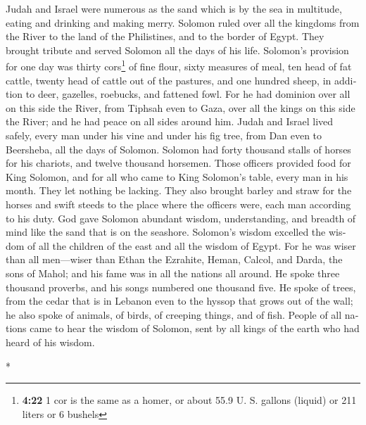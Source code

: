 \begin{paracol}{2}
\begin{otherlanguage}{english}
 Judah and Israel were numerous as the sand which is by
the sea in multitude, eating and drinking and making merry.
 Solomon ruled over all the kingdoms from the River to
the land of the Philistines, and to the border of Egypt. They brought
tribute and served Solomon all the days of his life. 
Solomon's provision for one day was thirty cors\footnote{\textbf{4:22} 1
  cor is the same as a homer, or about 55.9 U. S. gallons (liquid) or
  211 liters or 6 bushels} of fine flour, sixty measures of meal,
 ten head of fat cattle, twenty head of cattle out of the
pastures, and one hundred sheep, in addition to deer, gazelles,
roebucks, and fattened fowl.  For he had dominion over
all on this side the River, from Tiphsah even to Gaza, over all the
kings on this side the River; and he had peace on all sides around him.
 Judah and Israel lived safely, every man under his vine
and under his fig tree, from Dan even to Beersheba, all the days of
Solomon.  Solomon had forty thousand stalls of horses for
his chariots, and twelve thousand horsemen.  Those
officers provided food for King Solomon, and for all who came to King
Solomon's table, every man in his month. They let nothing be lacking.
 They also brought barley and straw for the horses and
swift steeds to the place where the officers were, each man according to
his duty.  God gave Solomon abundant wisdom,
understanding, and breadth of mind like the sand that is on the
seashore.  Solomon's wisdom excelled the wisdom of all
the children of the east and all the wisdom of Egypt. 
For he was wiser than all men---wiser than Ethan the Ezrahite, Heman,
Calcol, and Darda, the sons of Mahol; and his fame was in all the
nations all around.  He spoke three thousand proverbs,
and his songs numbered one thousand five.  He spoke of
trees, from the cedar that is in Lebanon even to the hyssop that grows
out of the wall; he also spoke of animals, of birds, of creeping things,
and of fish.  People of all nations came to hear the
wisdom of Solomon, sent by all kings of the earth who had heard of his
wisdom.

\end{otherlanguage}

\switchcolumn[0]*

\hypertarget{el-contrato-de-salomuxf3n-con-hiram-de-tiro-y-los-preparativos-para-la-construcciuxf3n-de-un-templo}{%
}
\end{paracol}
